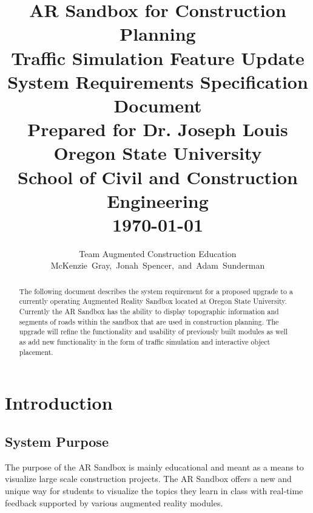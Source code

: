 \documentclass[letterpaper, 10pt, onecolumn, draftclsnofoot]{IEEEtran}
\begin{document}
\title{
    \Large{\textbf{AR Sandbox for Construction Planning \\
                   Traffic Simulation Feature Update}} \\
    \small{System Requirements Specification Document} \\
    \vspace{15pt}
    \large{Prepared for Dr. Joseph Louis \\
    Oregon State University \\
    School of Civil and Construction Engineering \\
    \today}
    }

\author{Team Augmented Construction Education \\
        McKenzie~Gray,~Jonah~Spencer,~and~Adam~Sunderman}
        
\maketitle
\vspace{200pt}
\begin{abstract}
    The following document describes the system requirement for a proposed upgrade to a currently operating Augmented Reality Sandbox located at Oregon State University. Currently the AR Sandbox has the ability to display topographic information and segments of roads within the sandbox that are used in construction planning. The upgrade will refine the functionality and usability of previously built modules as well as add new functionality in the form of traffic simulation and interactive object placement.
\end{abstract}
\newpage

\tableofcontents
\newpage

\section{\textbf{Introduction}}
    \subsection{\textbf{System Purpose}}
        The purpose of the AR Sandbox is mainly educational and meant as a means to visualize large scale construction projects. The AR Sandbox offers a new and unique way for students to visualize the topics they learn in class with real-time feedback supported by various augmented reality modules.
    
\end{document}
